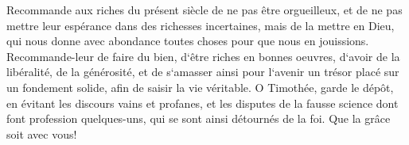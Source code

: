 \verse Recommande aux riches du présent siècle de ne pas être orgueilleux, et de ne pas mettre leur espérance dans des richesses incertaines, mais de la mettre en Dieu, qui nous donne avec abondance toutes choses pour que nous en jouissions. 
\verse Recommande-leur de faire du bien, d`être riches en bonnes oeuvres, d`avoir de la libéralité, de la générosité, 
\verse et de s`amasser ainsi pour l`avenir un trésor placé sur un fondement solide, afin de saisir la vie véritable. 
\verse O Timothée, garde le dépôt, en évitant les discours vains et profanes, 
\verse et les disputes de la fausse science dont font profession quelques-uns, qui se sont ainsi détournés de la foi. Que la grâce soit avec vous! 
